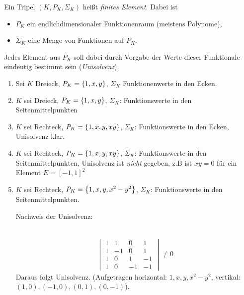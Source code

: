 
\begin{definition}
  Ein Tripel $(K, P_K, \Sigma_K)$ heißt \emph{finites Element}. Dabei ist
  \begin{itemize}
  \item $P_K$ ein endlichdimensionaler Funktionenraum (meistens Polynome), 
  \item $\Sigma_K$ eine Menge von Funktionen auf $P_K$.
  \end{itemize}
Jedes Element aus $P_K$ soll dabei durch Vorgabe der Werte dieser Funktionale eindeutig bestimmt sein (\emph{Unisolvenz}).
\end{definition}
\begin{beispiel}
  \begin{enumerate}
  \item Sei $K$ Dreieck, $P_K = \left\{ 1, x, y \right\}$, $\Sigma_K$ Funktionenwerte in den Ecken.
  \item $K$ sei Dreieck, $P_K= \left\{ 1, x, y \right\}$, $\Sigma_K$: Funktionswerte in den Seitenmittelpunkten
\item $K$ sei Rechteck, $P_K = \left\{ 1, x, y, xy \right\}$, $\Sigma_K$: Funktionswerte in den Ecken, Unisolvenz klar. 
\item $K$ sei Rechteck, $P_K = \left\{ 1, x, y, xy \right\}$, $\Sigma_K$: Funktionswerte in den Seitenmittelpunkten, Unisolvenz ist \emph{nicht} gegeben, z.B ist $xy = 0$ für ein Element $E = [-1, 1]^2$ 
\item $K$ sei Rechteck, $P_K = \left\{ 1, x, y, x^2-y^2 \right\}$, $\Sigma_K$: Funktionswerte in den Seitenmittelpunkten.

Nachweis der Unisolvenz:
\begin{tabular}{c|c|c|c|c}


  
\end{tabular}
\begin{align*}
  \begin{vmatrix}
    1 & 1& 0 &1\\
1 & -1& 0 & 1\\
1 & 0& 1 &-1\\
1 & 0& -1&-1
  \end{vmatrix} \neq 0 
\end{align*}
Daraus folgt Unisolvenz. (Aufgetragen horizontal: $1, x, y, x^2-y^2$, vertikal: $(1,0), (-1, 0), (0,1), (0,-1)$).
  \end{enumerate}
\end{beispiel}
